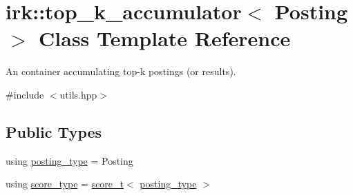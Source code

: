\hypertarget{classirk_1_1top__k__accumulator}{}\section{irk\+:\+:top\+\_\+k\+\_\+accumulator$<$ Posting $>$ Class Template Reference}
\label{classirk_1_1top__k__accumulator}


An container accumulating top-\/k postings (or results).  




{\ttfamily \#include $<$utils.\+hpp$>$}

\subsection*{Public Types}
\begin{DoxyCompactItemize}
\item 
using \mbox{\hyperlink{classirk_1_1top__k__accumulator_a0ffb312a1991ec1d640d436caa657ee5}{posting\+\_\+type}} = Posting
\item 
using \mbox{\hyperlink{classirk_1_1top__k__accumulator_a0f5b0bb5549996794b2a06fe17c694d9}{score\+\_\+type}} = \mbox{\hyperlink{namespaceirk_a87bce44d1e3fdff0b1b3bb78f2a5f924}{score\+\_\+t}}$<$ \mbox{\hyperlink{classirk_1_1top__k__accumulator_a0ffb312a1991ec1d640d436caa657ee5}{posting\+\_\+type}} $>$
\end{DoxyCompactItemize}

